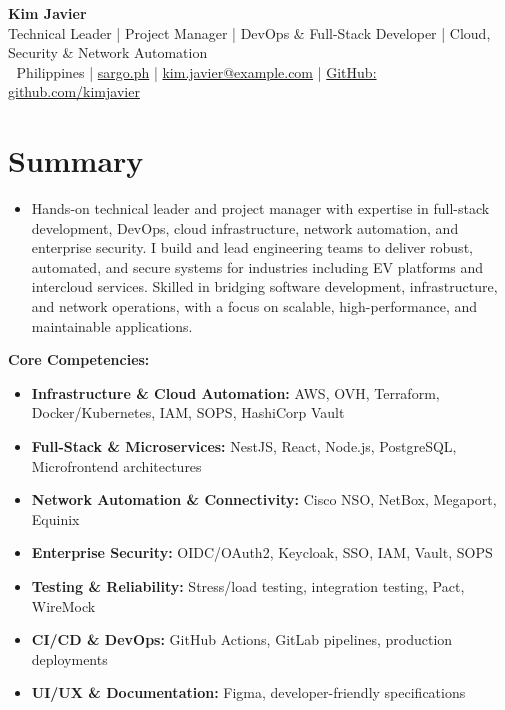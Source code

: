 \documentclass[letterpaper,11pt]{article}
\newcommand{\resumeItem}[1]{
  \item\small{#1 \vspace{-2pt}}
}
\newcommand{\resumeItemListStart}{\begin{itemize}[leftmargin=0.15in, noitemsep, label={$\cdot$}]}
\newcommand{\resumeItemListEnd}{\end{itemize}\vspace{-5pt}}
\begin{document}
\begin{center}
    \textbf{\Huge Kim Javier} \\ \vspace{1pt}
    Technical Leader | Project Manager | DevOps \& Full-Stack Developer | Cloud, Security \& Network Automation \\ \vspace{1pt}
    \small 📍 Philippines | \href{https://sargo.ph}{sargo.ph} | \href{mailto:kim.javier@example.com}{kim.javier@example.com} | \href{https://github.com/kimjavier}{GitHub: github.com/kimjavier}
\end{center}

\section{Summary}
  \resumeItemListStart
    \resumeItem{Hands-on technical leader and project manager with expertise in full-stack development, DevOps, cloud infrastructure, network automation, and enterprise security. I build and lead engineering teams to deliver robust, automated, and secure systems for industries including EV platforms and intercloud services. Skilled in bridging software development, infrastructure, and network operations, with a focus on scalable, high-performance, and maintainable applications.}
  \resumeItemListEnd
  \vspace{-5pt}
  \textbf{Core Competencies:}
  \resumeItemListStart
    \resumeItem{\textbf{Infrastructure \& Cloud Automation:} AWS, OVH, Terraform, Docker/Kubernetes, IAM, SOPS, HashiCorp Vault}
    \resumeItem{\textbf{Full-Stack \& Microservices:} NestJS, React, Node.js, PostgreSQL, Microfrontend architectures}
    \resumeItem{\textbf{Network Automation \& Connectivity:} Cisco NSO, NetBox, Megaport, Equinix}
    \resumeItem{\textbf{Enterprise Security:} OIDC/OAuth2, Keycloak, SSO, IAM, Vault, SOPS}
    \resumeItem{\textbf{Testing \& Reliability:} Stress/load testing, integration testing, Pact, WireMock}
    \resumeItem{\textbf{CI/CD \& DevOps:} GitHub Actions, GitLab pipelines, production deployments}
    \resumeItem{\textbf{UI/UX \& Documentation:} Figma, developer-friendly specifications}
  \resumeItemListEnd

\end{document}
